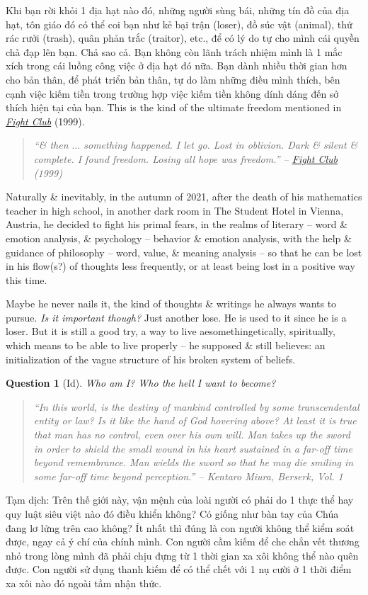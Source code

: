 \documentclass[12pt,oneside]{book}
\newtheorem{question}{Question}
\begin{document}
Khi bạn rời khỏi 1 địa hạt nào đó, những người sùng bái, những tín đồ của địa hạt, tôn giáo đó có thể coi bạn như kẻ bại trận (loser), đồ súc vật (animal), thứ rác rưởi (trash), quân phản trắc (traitor), etc., để có lý do tự cho mình cái quyền chà đạp lên bạn. Chả sao cả. Bạn không còn lãnh trách nhiệm mình là 1 mắc xích trong cái luồng công việc ở địa hạt đó nữa. Bạn dành nhiều thời gian hơn cho bản thân, để phát triển bản thân, tự do làm những điều mình thích, bên cạnh việc kiếm tiền trong trường hợp việc kiếm tiền không dính dáng đến sở thích hiện tại của bạn. This is the kind of the ultimate freedom mentioned in \href{https://www.imdb.com/title/tt0137523}{\it Fight Club} (1999).
\begin{quote}\it
	``\& then $\ldots$ something happened. I let go. Lost in oblivion. Dark \& silent \& complete. I found freedom. Losing all hope was freedom.'' -- \href{https://www.imdb.com/title/tt0137523}{\it Fight Club} (1999)
\end{quote}
Naturally \& inevitably, in the autumn of 2021, after the death of his mathematics teacher in high school, in another dark room in The Student Hotel in Vienna, Austria, he decided to fight his primal fears, in the realms of literary -- word \& emotion analysis, \& psychology -- behavior \& emotion analysis, with the help \& guidance of philosophy -- word, value, \& meaning analysis -- so that he can be lost in his flow(s?) of thoughts less frequently, or at least being lost in a positive way this time.

Maybe he never nails it, the kind of thoughts \& writings he always wants to pursue. {\it Is it important though?} Just another lose. He is used to it since he is a loser. But it is still a good try, a way to live aesomethingetically, spiritually, which means to be able to live properly -- he supposed \& still believes: an initialization of the vague structure of his broken system of beliefs.

\begin{question}[Id]
	Who am I? Who the hell I want to become?
\end{question}

\begin{quotation}\it
	``In this world, is the destiny of mankind controlled by some transcendental entity or law? Is it like the hand of God hovering above? At least it is true that man has no control, even over his own will. Man takes up the sword in order to shield the small wound in his heart sustained in a far-off time beyond remembrance. Man wields the sword so that he may die smiling in some far-off time beyond perception.'' -- {\sc Kentaro Miura}, {\it Berserk}, Vol. 1
\end{quotation}
{\sf Tạm dịch}: Trên thế giới này, vận mệnh của loài người có phải do 1 thực thể hay quy luật siêu việt nào đó điều khiển không? Có giống như bàn tay của Chúa đang lơ lửng trên cao không? Ít nhất thì đúng là con người không thể kiểm soát được, ngay cả ý chí của chính mình. Con người cầm kiếm để che chắn vết thương nhỏ trong lòng mình đã phải chịu đựng từ 1 thời gian xa xôi không thể nào quên được. Con người sử dụng thanh kiếm để có thể chết với 1 nụ cười ở 1 thời điểm xa xôi nào đó ngoài tầm nhận thức.
\end{document}
